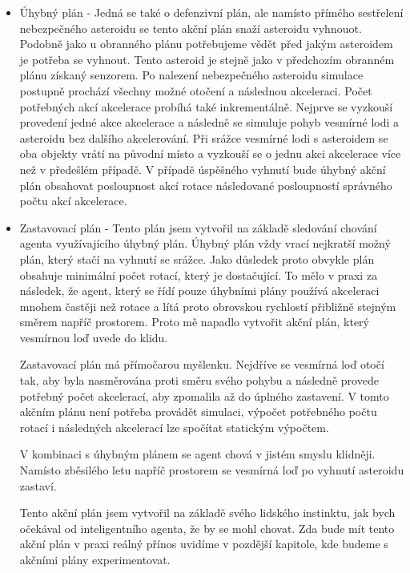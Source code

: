 \begin{itemize}
    
    \item Úhybný plán - Jedná se také o defenzivní plán, ale namísto přímého sestřelení nebezpečného asteroidu se tento akční plán snaží asteroidu vyhnouot.
    Podobně jako u obranného plánu potřebujeme vědět před jakým asteroidem je potřeba se vyhnout. Tento asteroid je stejně jako v předchozím obranném plánu získaný senzorem. Po nalezení nebezpečného asteroidu simulace postupně prochází všechny možné otočení a následnou akceleraci.
    Počet potřebných akcí akcelerace probíhá také inkrementálně. Nejprve se vyzkouší provedení jedné akce akcelerace a následně se simuluje pohyb vesmírné lodi a asteroidu bez dalšího akcelerování.
    Při srážce vesmírné lodi s asteroidem se oba objekty vrátí na původní místo a vyzkouší se o jednu akci akcelerace více než v předešlém případě.
    V případě úspěšného vyhnutí bude úhybný akční plán obsahovat posloupnost akcí rotace následované posloupností správného počtu akcí akcelerace.
    
    \item Zastavovací plán - Tento plán jsem vytvořil na základě sledování chování agenta využívajícího úhybný plán. Úhybný plán vždy vrací nejkratší možný plán, který stačí na vyhnutí se srážce. Jako důsledek proto obvykle plán obsahuje minimální počet rotací, který je dostačující.
        To mělo v praxi za následek, že agent, který se řídí pouze úhybními plány používá akceleraci mnohem častěji než rotace a lítá proto obrovskou rychlostí přibližně stejným směrem napříč prostorem. Proto mě napadlo vytvořit akční plán, který vesmírnou loď uvede do klidu.
        \par
        Zastavovací plán má přímočarou myšlenku. 
        Nejdříve se vesmírná loď otočí tak, aby byla nasměrována proti směru svého pohybu a následně provede potřebný počet akcelerací, aby zpomalila až do úplného zastavení. 
        V tomto akčním plánu není potřeba provádět simulaci, výpočet potřebného počtu rotací i následných akcelerací lze spočítat statickým výpočtem.
        
        \par
        V kombinaci s úhybným plánem se agent chová v jistém smyslu klidněji.
        Namísto zběsilého letu napříč prostorem se vesmírná loď po vyhnutí asteroidu zastaví.            
        \par
        Tento akční plán jsem vytvořil na základě svého lidského instinktu, jak bych očekával od inteligentního agenta, že by se mohl chovat. Zda bude mít tento akční plán v praxi reálný přínos uvidíme v pozdější kapitole, kde budeme s akčními plány experimentovat.
        
        
\end{itemize}


